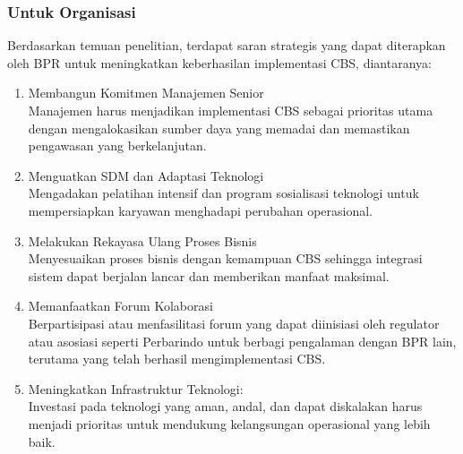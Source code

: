 \documentclass[journal,article,submit,pdftex,moreauthors]{Definitions/mdpi}
\begin{document}
\subsubsection{Untuk Organisasi}
Berdasarkan temuan penelitian, terdapat saran strategis yang dapat diterapkan oleh BPR untuk meningkatkan keberhasilan implementasi CBS, diantaranya:
\begin{enumerate}
   \item Membangun Komitmen Manajemen Senior
   \\ Manajemen harus menjadikan implementasi CBS sebagai prioritas utama dengan mengalokasikan sumber daya yang memadai dan memastikan pengawasan yang berkelanjutan.
\item Menguatkan SDM dan Adaptasi Teknologi
\\ Mengadakan pelatihan intensif dan program sosialisasi teknologi untuk mempersiapkan karyawan menghadapi perubahan operasional.

\item Melakukan Rekayasa Ulang Proses Bisnis
\\ Menyesuaikan proses bisnis dengan kemampuan CBS sehingga integrasi sistem dapat berjalan lancar dan memberikan manfaat maksimal.

\item Memanfaatkan Forum Kolaborasi
\\ Berpartisipasi atau menfasilitasi forum yang dapat diinisiasi oleh regulator atau asosiasi seperti Perbarindo untuk berbagi pengalaman dengan BPR lain, terutama yang telah berhasil mengimplementasi CBS.

\item Meningkatkan Infrastruktur Teknologi:
\\ Investasi pada teknologi yang aman, andal, dan dapat diskalakan harus menjadi prioritas untuk mendukung kelangsungan operasional yang lebih baik.


\end{enumerate}

\end{document}
